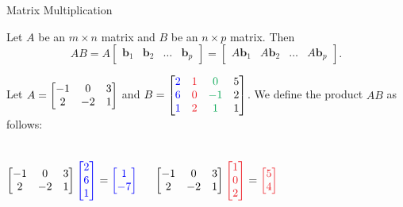 \documentclass[xcolor=dvipsnames,aspectratio=169,t]{beamer}
\begin{document}
\begin{frame}{Matrix Multiplication}

\bbox
Let $A$ be an $m \times n$ matrix and $B$ be an $n \times p$ matrix. Then 
\[ AB = A \begin{bmatrix} \mathbf{b}_1 & \mathbf{b}_2 & \ldots & \mathbf{b}_p \end{bmatrix} =  \begin{bmatrix} A \mathbf{b}_1 & A \mathbf{b}_2 & \ldots &A \mathbf{b}_p \end{bmatrix} .\]
\ebox


Let $\displaystyle A = \begin{bmatrix} -1 & 0 & 3\\ 2 & -2 & 1 \end{bmatrix}$ and $\dsty B = \begin{bmatrix} \colorb{2} & \colorr{1} & \colorg{0} & 5\\ \colorb{6} & \colorr{0} & \colorg{-1} & 2\\ \colorb{1} & \colorr{2} & \colorg{1} & 1 \end{bmatrix}$. We define the product $AB$ as follows:



\begin{columns}[T]
\column{0.33\tw}
\[  \begin{bmatrix} -1 & 0 & 3\\ 2 & -2 & 1 \end{bmatrix} \textcolor{blue}{\begin{bmatrix}2\\6\\1 \end{bmatrix}} =  \textcolor{blue}{\begin{bmatrix} 1\\ -7 \end{bmatrix}} \]

\column{0.33\tw}
\[  \begin{bmatrix} -1 & 0 & 3\\ 2 & -2 & 1 \end{bmatrix} \colorr{\begin{bmatrix}1\\0\\2 \end{bmatrix}} =  \colorr{\begin{bmatrix} 5\\ 4 \end{bmatrix}} \]


\end{columns}
\end{frame}
\end{document}
